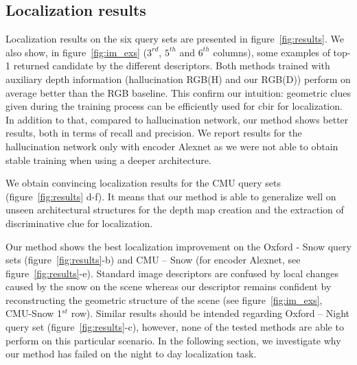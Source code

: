 

\subsection{Localization results}
\label{subsec:results}

Localization results on the six query sets are presented in figure~\ref{fig:results}. We also show, in figure~\ref{fig:im_exs} ($3^{rd}$, $5^{th}$ and $6^{th}$ columns), some examples of top-1 returned candidate by the different descriptors. Both methods trained with auxiliary depth information (hallucination RGB(H) and our RGB(D)) perform on average better than the RGB baseline. This confirm our intuition:  geometric clues given during the training process can be efficiently used for \ac{cbir} for localization. In addition to that, compared to hallucination network, our method shows better results, both in terms of recall and precision. We report results for the hallucination network only with encoder Alexnet as we were not able to obtain stable training when using a deeper architecture.

We obtain convincing localization results for the CMU query sets (figure~\ref{fig:results} d-f). It means that our method is able to generalize well on unseen architectural structures for the depth map creation and the extraction of discriminative clue for localization.

Our method shows the best localization improvement on the Oxford - Snow query sets (figure~\ref{fig:results}-b) and CMU -- Snow (for encoder Alexnet, see figure~\ref{fig:results}-e). Standard image descriptors are confused by local changes caused by the snow on the scene whereas our descriptor remains confident by reconstructing the geometric structure of the scene (see figure~\ref{fig:im_exs}, CMU-Snow 1$^{st}$ row). Similar results should be intended regarding Oxford -- Night query set (figure~\ref{fig:results}-c), however, none of the tested methods are able to perform on this particular scenario. In the following section, we investigate why our method has failed on the night to day localization task.

